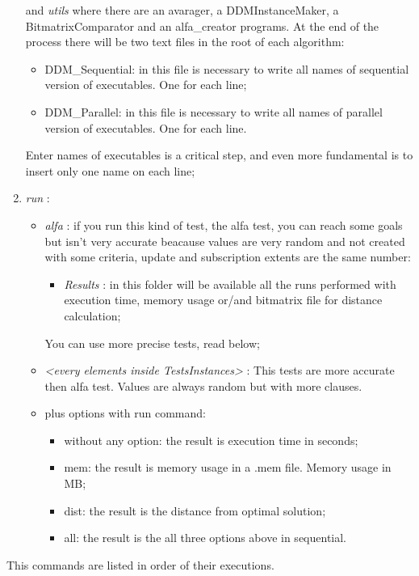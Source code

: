 \documentclass[a4paper,11pt]{report}
\newcommand{\folder}[1]{
  \textcolor{foldercolor}{\textit{#1}}
}
\newcommand{\command}[1]{
  \textcolor{commandcolor}{\textit{#1}}
}
\begin{document}
\begin{enumerate}
  and \folder{utils} where there are an avarager, a DDMInstanceMaker, a BitmatrixComparator and an
  alfa\_creator programs.
  At the end of the process there will be two text files in the root of each algorithm:
  \begin{itemize}
   \item DDM\_Sequential: in this file is necessary to write all names of sequential version 
   of executables. One for each line;
   \item DDM\_Parallel: in this file is necessary to write all names of parallel version of
   executables. One for each line.
  \end{itemize}
  Enter names of executables is a critical step, and even more fundamental is to insert only 
  one name on each line;
  \item \command{run}:
    \begin{itemize}
     \item \command{alfa}: if you run this kind of test, the alfa test, you can reach some
      goals but isn't very accurate beacause values are very random and not created with some
      criteria, update and subscription extents are the same number:
      \begin{itemize}
       \item \folder{Results}: in this folder will be available all the runs performed with 
       execution time, memory usage or/and bitmatrix file for distance calculation;
      \end{itemize}
      You can use more precise tests, read below;
     \item \command{<every elements inside TestsInstances>}: This tests are more accurate then
     alfa test. Values are always random but with more clauses.
     \item plus options with run command:
     \begin{itemize}
      \item without any option: the result is execution time in seconds;
      \item mem: the result is memory usage in a .mem file. Memory usage in MB;
      \item dist: the result is the distance from optimal solution;
      \item all: the result is the all three options above in sequential.
     \end{itemize}
    \end{itemize}
 \end{enumerate}
 This commands are listed in order of their executions.
 
\end{document}
